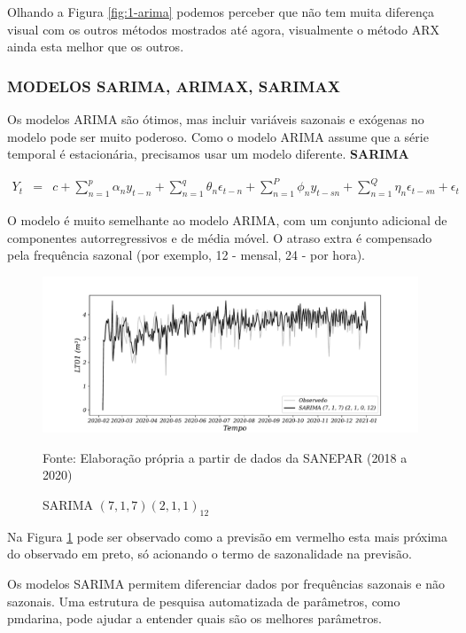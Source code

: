 Olhando a Figura \ref{fig:1-arima} podemos perceber que não tem muita diferença visual com os outros métodos mostrados até agora, visualmente o método ARX ainda esta melhor que os outros.  


\subsubsection{MODELOS SARIMA, ARIMAX, SARIMAX}

Os modelos ARIMA são ótimos, mas incluir variáveis sazonais e exógenas no modelo pode ser muito poderoso. Como o modelo ARIMA assume que a série temporal é estacionária, precisamos usar um modelo diferente.
\textbf{SARIMA}

\begin{eqnarray}
	Y_t&=&c+\sum_{n=1}^p \alpha_n y_{t-n}+\sum_{n=1}^q \theta_n \epsilon_{t-n}+\sum_{n=1}^P \phi_n y_{t-s n}+\sum_{n=1}^Q \eta_n \epsilon_{t-s n}+\epsilon_t \label{sarima}
\end{eqnarray}

O modelo é muito semelhante ao modelo ARIMA, com um conjunto adicional de componentes autorregressivos e de média móvel. O atraso extra é compensado pela frequência sazonal (por exemplo, 12 - mensal, 24 - por hora). 

\begin{figure}[H]
	\centering
	\caption{SARIMA $(7,1,7) (2,1,1)_{12}$}
	\label{fig:1-sarima}
	\includegraphics[width=1\linewidth]{Modelos/Figuras/1-SARIMA}
	
	Fonte: Elaboração própria a partir de dados da SANEPAR (2018 a 2020)
\end{figure}

Na Figura \ref{fig:1-sarima} pode ser observado como a previsão em vermelho esta mais próxima do observado em preto, só acionando o termo de sazonalidade na previsão. 

Os modelos SARIMA permitem diferenciar dados por frequências sazonais e não sazonais. Uma estrutura de pesquisa automatizada de parâmetros, como pmdarina, pode ajudar a entender quais são os melhores parâmetros.

